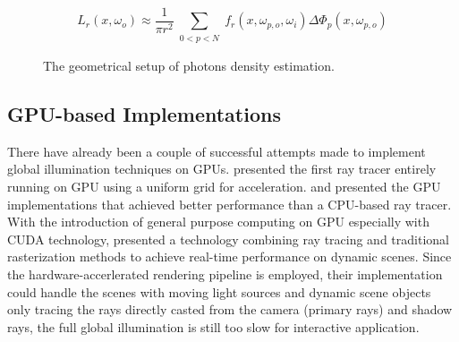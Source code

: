 \begin{equation}
L_r(x, \omega_{o}) \approx \frac{1}{\pi r^{2}}\sum_{\substack{0<p<N}}f_{r}(x, \omega_{p, o}, \omega_{i})\Delta \Phi_{p}(x,\omega_{p, o})
\label{eq:photon_estimate}
\end{equation}

\begin{figure}[ftp]
    \centering
    \renewcommand{\thefigure}{\thechapter.\arabic{figure}}
    \caption[Photon Density Estimation Model]{The geometrical setup of photons density estimation.}
    \label{fig:photon_density_estimate}
\end{figure}

\subsection{GPU-based Implementations}
There have already been a couple of successful attempts made to implement global illumination techniques on GPUs. \citeauthor{Purcell:2002:RTP:566654.566640} \cite{Purcell:2002:RTP:566654.566640} presented the first ray tracer entirely running on GPU using a uniform grid for acceleration. \cite{Horn:2007:IKT:1230100.1230129} and \cite{Popov2007} presented the GPU implementations that achieved better performance than a CPU-based ray tracer. With the introduction of general purpose computing on GPU especially with CUDA technology, \citeauthor{Luebke2008} \cite{Luebke2008} presented a technology combining ray tracing and traditional rasterization methods to achieve real-time performance on dynamic scenes. Since the hardware-accerlerated rendering pipeline is employed, their implementation could handle the scenes with moving light sources and dynamic scene objects only tracing the rays directly casted from the camera (primary rays) and shadow rays, the full global illumination is still too slow for interactive application. 

